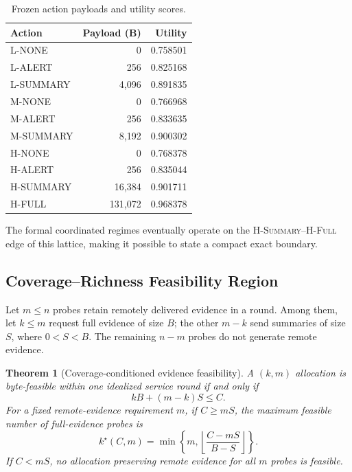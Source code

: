 \documentclass[10pt,journal]{IEEEtran}
\newtheorem{theorem}{Theorem}
\newcommand{\Hsummary}{\textsc{H-Summary}}
\newcommand{\Hfull}{\textsc{H-Full}}
\begin{document}
\begin{table}[t]
\centering
\caption{Frozen action payloads and utility scores.}
\label{tab:actions}
\scriptsize
\begin{tabular}{@{}lrr@{}}
\toprule
Action & Payload (B) & Utility \\
\midrule
L-NONE    & 0      & 0.758501 \\
L-ALERT   & 256    & 0.825168 \\
L-SUMMARY & 4,096  & 0.891835 \\
M-NONE    & 0      & 0.766968 \\
M-ALERT   & 256    & 0.833635 \\
M-SUMMARY & 8,192  & 0.900302 \\
H-NONE    & 0      & 0.768378 \\
H-ALERT   & 256    & 0.835044 \\
H-SUMMARY & 16,384 & 0.901711 \\
H-FULL    & 131,072& 0.968378 \\
\bottomrule
\end{tabular}
\end{table}

The formal coordinated regimes eventually operate on the
\Hsummary--\Hfull{} edge of this lattice, making it possible to state a
compact exact boundary.

\subsection{Coverage--Richness Feasibility Region}

Let $m\leq n$ probes retain remotely delivered evidence in a round.
Among them, let $k\leq m$ request full evidence of size $B$; the other
$m-k$ send summaries of size $S$, where $0<S<B$.
The remaining $n-m$ probes do not generate remote evidence.

\begin{theorem}[Coverage-conditioned evidence feasibility]
\label{thm:frontier}
A $(k,m)$ allocation is byte-feasible within one idealized service round
if and only if
\begin{equation}
kB+(m-k)S\leq C .
\label{eq:feasible}
\end{equation}
For a fixed remote-evidence requirement $m$, if $C\geq mS$, the maximum
feasible number of full-evidence probes is
\begin{equation}
k^\star(C,m)
=
\min\left\{
m,
\left\lfloor
\frac{C-mS}{B-S}
\right\rfloor
\right\}.
\label{eq:kstar}
\end{equation}
If $C<mS$, no allocation preserving remote evidence for all $m$ probes
is feasible.
\end{theorem}
\end{document}
